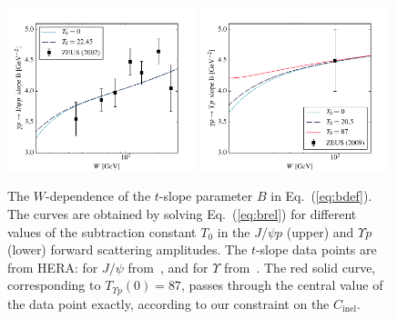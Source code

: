 \documentclass[prd,amsmath,twocolumn,floatfix,amssymb, preprintnumbers, linenumbers,nofootinbib, superscriptaddress]{revtex4}
\begin{document}
 
\begin{figure}[h]
\includegraphics[width=0.49\textwidth]{b_slope_jpsi.pdf}
\includegraphics[width=0.49\textwidth]{b_slope_y.pdf}
\caption{
The $W$-dependence of the $t$-slope parameter $B$ in  Eq.~(\ref{eq:bdef}). The curves are obtained by solving 
Eq.~(\ref{eq:brel}) for different values of the subtraction constant $T_0$ in the $J/\psi p $ (upper)  and $\Upsilon p$ (lower) forward scattering amplitudes.
The $t$-slope data points are from HERA: for $J/\psi$ from~\cite{Chekanov:2002xi}, 
and for $\Upsilon$ from~\cite{Chekanov:2009zz}. 
The red solid curve, corresponding to $T_{\Upsilon p}(0)=87$, passes through the central value of the data point exactly, according to our constraint on the $C_\mathrm{inel}$.
}
\label{fig:bslope}
\end{figure}
\end{document}
